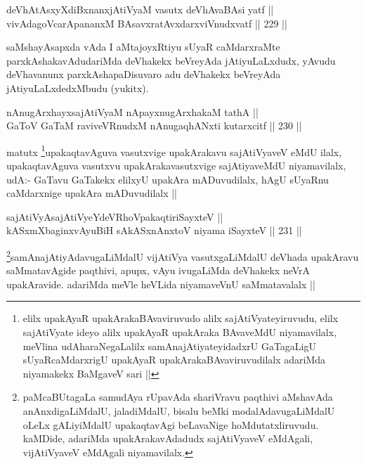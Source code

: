 
\begin{shl}
deVhAtAsxyXdiBxnanxjAtiVyaM vasutx deVhAvaBAsi yatf || \\
vivAdagoVcarApananxM BAsavxratAvxdarxviVnudxvatf ||  229 ||  
\end{shl}

\begin{artha}
saMshayAsapxda vAda I aMtajoyxRtiyu sUyaR caMdarxraMte parxkAshakavAdudariMda deVhakekx beVreyAda jAtiyuLaLxdudx, yAvudu deVhavanunx parxkAshapaDisuvaro adu deVhakekx beVreyAda jAtiyuLaLxdedxMbudu (yukitx).
\end{artha}

\begin{shl}
nAnugArxhayxsajAtiVyaM nApayxnugArxhakaM tathA || \\
GaToV GaTaM raviveVRnudxM nAnugaqhANxti kutarxcitf ||  230 ||  
\end{shl}

\begin{artha}
matutx \footnote{elilx upakAyaR upakArakaBAvaviruvudo alilx sajAtiVyateyiruvudu, elilx sajAtiVyate ideyo alilx upakAyaR upakAraka BAvaveMdU niyamavilalx, meVlina udAharaNegaLalilx samAnajAtiyateyidadxrU GaTagaLigU sUyaRcaMdarxrigU upakAyaR upakArakaBAvaviruvudilalx adariMda niyamakekx BaMgaveV sari ||}upakaqtavAguva vasutxvige upakArakavu sajAtiVyaveV eMdU ilalx, upakaqtavAguva vasutxvu upakArakavasutxvige sajAtiyaveMdU niyamavilalx, udA:- GaTavu GaTakekx elilxyU upakAra mADuvudilalx, hAgU sUyaRnu caMdarxnige upakAra mADuvudilalx ||
\end{artha}

\begin{shl}
sajAtiVyAsajAtiVyeYdeVRhoVpakaqtiriSayxteV || \\
kASxmXbaginxvAyuBiH sAkASxnAnxtoV niyama iSayxteV ||  231 ||  
\end{shl}

\begin{artha}
\footnote{paMcaBUtagaLa samudAya rUpavAda shariVravu paqthivi aMshavAda anAnxdigaLiMdalU, jaladiMdalU, bisalu beMki modalAdavugaLiMdalU oLeLx gALiyiMdalU upakaqtavAgi beLavaNige hoMdutatxliruvudu. kaMDide, adariMda upakArakavAdadudx sajAtiVyaveV eMdAgali, vijAtiVyaveV eMdAgali niyamavilalx.}samAnajAtiyAdavugaLiMdalU vijAtiVya vasutxgaLiMdalU deVhada upakAravu saMmatavAgide paqthivi, apupx, vAyu ivugaLiMda deVhakekx neVrA upakAravide. adariMda meVle heVLida niyamaveVnU saMmatavalalx ||
\end{artha}

